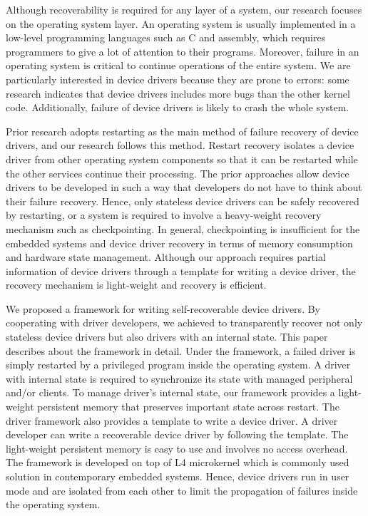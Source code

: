\documentclass{report}
\begin{document}

Although recoverability is required for any layer of a system, our research focuses on the operating system layer.  An operating system is usually implemented in a low-level programming languages such as C and assembly, which requires programmers to give a lot of attention to their programs.  Moreover, failure in an operating system is critical to continue operations of the entire system.  We are particularly interested in device drivers because they are prone to errors:  some research indicates that device drivers includes more bugs than the other kernel code\cite{Chou2001}.  Additionally, failure of device drivers is likely to crash the whole system.

Prior research adopts restarting as the main method of failure recovery of device drivers\cite{Swift2006}\cite{Herder2007}, and our research follows this method.  Restart recovery isolates a device driver from other operating system components so that it can be restarted while the other services continue their processing.  The prior approaches allow device drivers to be developed in such a way that developers do not have to think about their failure recovery.  Hence, only stateless device drivers can be safely recovered by restarting, or a system is required to involve a heavy-weight recovery mechanism such as checkpointing.  In general, checkpointing is insufficient for the embedded systems and device driver recovery in terms of memory consumption and hardware state management.  Although our approach requires partial information of device drivers through a template for writing a device driver, the recovery mechanism is light-weight and recovery is efficient.

We proposed a framework for writing self-recoverable device drivers\cite{ishikawa08a-framework}.  By cooperating with driver developers, we achieved to transparently recover not only stateless device drivers but also drivers with an internal state.  This paper describes about the framework in detail.  Under the framework, a failed driver is simply restarted by a privileged program inside the operating system.  A driver with internal state is required to synchronize its state with managed peripheral and/or clients.  To manage driver's internal state, our framework provides a light-weight persistent memory that preserves important state across restart.  The driver framework also provides a template to write a device driver.  A driver developer can write a recoverable device driver by following the template.  The light-weight persistent memory is easy to use and involves no access overhead.  The framework is developed on top of L4 microkernel\cite{L4X2} which is commonly used solution in contemporary embedded systems.  Hence, device drivers run in user mode and are isolated from each other to limit the propagation of failures inside the operating system.
\end{document}
